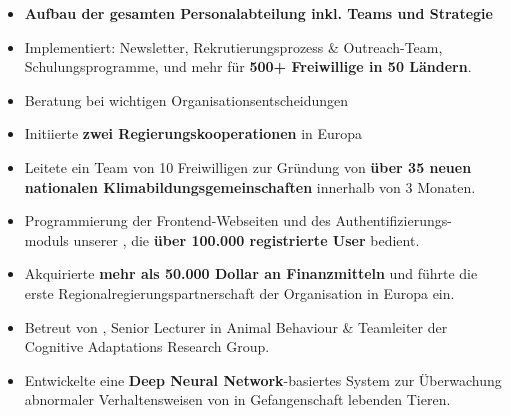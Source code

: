 \documentclass[10pt,a4paper,ragged2e,withhyper]{altacv}
\begin{document}
\begin{paracol}{2}


\begin{itemize}
    \item \textbf{Aufbau der gesamten Personalabteilung inkl. Teams und  Strategie}
    \item Implementiert: Newsletter, Rekrutierungsprozess \& Outreach-Team, Schulungsprogramme,  und mehr für \textbf{500+ Freiwillige in 50 Ländern}.
    \item Beratung bei wichtigen Organisationsentscheidungen
\end{itemize}

\divider

\begin{itemize}
    \item Initiierte \textbf{zwei Regierungskooperationen} in Europa
    \item Leitete ein Team von 10 Freiwilligen zur Gründung von \textbf{über 35 neuen nationalen Klimabildungsgemeinschaften} innerhalb von 3 Monaten.
\end{itemize}

\divider

\begin{itemize}
    \item Programmierung der Frontend-Webseiten und des Authentifizierungs-\\
    moduls unserer , die \textbf{über 100.000 registrierte User} bedient.
    \item Akquirierte \textbf{mehr als 50.000 Dollar an Finanzmitteln} und führte die erste Regionalregierungspartnerschaft der Organisation in Europa ein.
\end{itemize}
 

\begin{itemize}
    \item Betreut von , Senior Lecturer in Animal Behaviour \& Teamleiter der Cognitive Adaptations Research Group.
    \item Entwickelte eine \textbf{Deep Neural Network}-basiertes System zur Überwachung abnormaler Verhaltensweisen von in Gefangenschaft lebenden Tieren.
\end{itemize}


\end{paracol}
\end{document}
